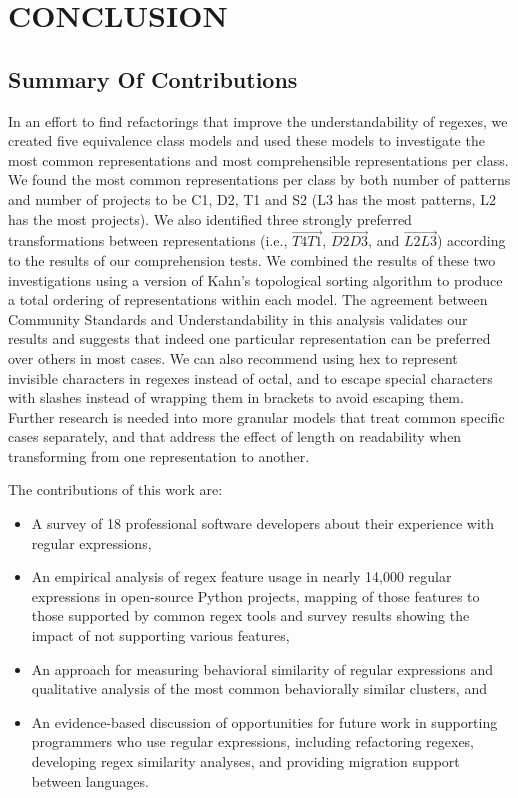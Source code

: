 \chapter{CONCLUSION}

\section{Summary Of Contributions}
In an effort to find refactorings that improve the understandability of regexes, we created five equivalence class models and used these models to investigate the most common representations and most comprehensible representations per class.  We found the most common representations per class by both number of patterns and number of projects to be C1, D2, T1 and S2 (L3 has the most patterns, L2 has the most projects).
We also identified three strongly preferred transformations between representations (i.e., $\overrightarrow{T4 T1}$, $\overrightarrow{D2 D3}$, and  $\overrightarrow{L2 L3}$) according to the results of our comprehension tests.  We combined the results of these two investigations using a version of Kahn's topological sorting algorithm to produce a total ordering of representations within each model.  The agreement between Community Standards and Understandability in this analysis validates our results and suggests that indeed one particular representation can be preferred over others in most cases.  We can also recommend using hex to represent invisible characters in regexes instead of octal, and to escape special characters with slashes instead of wrapping them in brackets to avoid escaping them.  Further research is needed into more granular models that treat common specific cases separately, and that address the effect of length on readability when transforming from one representation to another.


The contributions of this work are:
\begin{itemize} \setlength \itemsep{.1pt}
    \item A survey of 18 professional software developers about their experience with regular expressions,
    \item An empirical analysis of regex feature usage in nearly 14,000 regular expressions in  open-source Python projects, mapping of those features to those supported by common regex tools and survey results showing the impact of not supporting various features,
    \item An approach for measuring behavioral similarity of regular expressions and qualitative analysis of the most common behaviorally similar clusters, and
    \item An evidence-based discussion of opportunities for future work in supporting programmers who use regular expressions, including refactoring regexes, developing regex similarity analyses, and providing migration support between languages.
\end{itemize}
